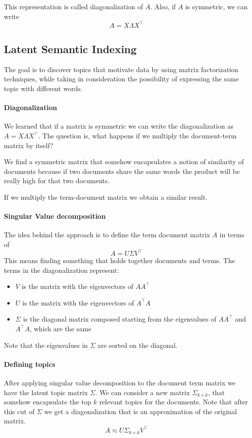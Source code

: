 This representation is called diagonalization of $A$.
Also, if $A$ is symmetric, we can write
$$A = X\varLambda X^{\top}$$

\subsection{Latent Semantic Indexing}
The goal is to discover topics that motivate data
by using matrix factorization techniques, while 
taking in consideration the possibility of expressing
the same topic with different words.

\paragraph{Diagonalization}
We learned that if a matrix is symmetric we can write the 
diagonalization as $A = X\varLambda X^{\top}$.
The question is, what happens if we multiply the 
document-term matrix by itself? 

We find a symmetric matrix that somehow encapsulates a notion of similarity 
of documents because if two documents share the same words the 
product will be really high for that two documents.

If we multiply the term-document matrix we obtain a similar result.

\paragraph{Singular Value decomposition}
The idea behind the approach is to define the term document matrix 
$A$ in terms of $$A = U \Sigma V^\top$$
This means finding something that holds together documents and terms. 
The terms in the diagonalization represent:
\begin{itemize}
    \item$V$ is the matrix with the eigenvectors of $AA^\top$
    \item$U$ is the matrix with the eigenvectors of $A^\top A$
    \item $\Sigma$ is the diagonal matrix composed starting from the eigenvalues
    of $A A^\top$ and $A^\top A$, which are the same
\end{itemize}
Note that the eigenvalues in $\Sigma$ are sorted on the diagonal.

\paragraph{Defining topics}
After applying singular value decomposition 
to the document term matrix we have the latent topic matrix
$\Sigma$.
We can consider a new matrix $\Sigma_{k \times k}$, that 
somehow encapsulate the top $k$ relevant topics for 
the documents.
Note that after this cut of $\Sigma$ we get a diagonalization 
that is an approximation of the original matrix.
$$A \approx U \Sigma_{k \times k} V^\top$$

